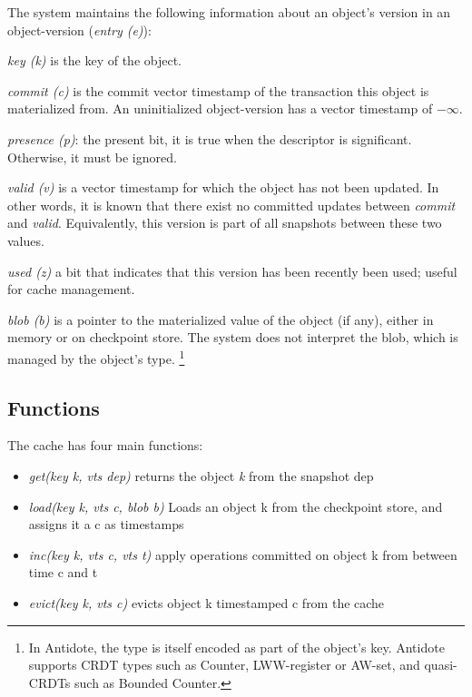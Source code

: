 \documentclass[11pt]{article}
\begin{document}
The system maintains the following information about an object's version
in an object-version (\emph{entry (e)}):
\begin{compactitem}
\item
  \emph{key (k)} is the key of the object.
\item
  \emph{commit (c)} is the commit vector timestamp of the transaction
  this object is materialized from.
  An uninitialized object-version has a vector timestamp of $-\infty$.
\item
\emph{presence (p)}: the present bit, it is true when the descriptor is
significant. 
Otherwise, it must be ignored.
\item
  \emph{valid (v)} is a vector timestamp for which the object has
  not been updated.
  In other words, it is known that there exist no committed
  updates between \emph{commit} and \emph{valid}.
  Equivalently, this version is part of all snapshots between these two
  values.
\item
  \emph{used (z)} a bit that indicates that this version has been recently been
  used; useful for cache management.
\item
  \emph{blob (b)} is a pointer to the materialized value of the object (if
  any), either in memory or on checkpoint store.
  The system does not interpret the blob, which is managed by the
  object's type.%
  \footnote{
    In Antidote, the type is itself encoded as part of the object's key.
    Antidote supports CRDT types such as Counter, LWW-register or
    AW-set, and quasi-CRDTs such as Bounded Counter.
  }
\end{compactitem}


\subsection{Functions}
The cache has four main functions:
\begin{itemize}
  \item \emph{get(key k, vts dep)} returns the object \emph{k} from the snapshot dep
  \item \emph{load(key k, vts c, blob b)} Loads an object k from the checkpoint
  store, and assigns it a c as timestamps 
  \item \emph{inc(key k, vts c, vts t)} apply operations committed on object k from
  between time c and t 
  \item \emph{evict(key k, vts c)} evicts object k timestamped c from the cache

\end{itemize}
\end{document}
